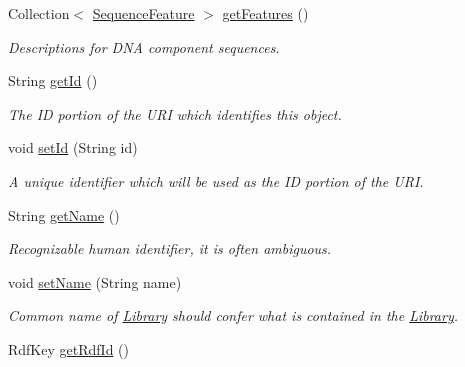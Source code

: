 \begin{DoxyCompactItemize}
Collection$<$ \hyperlink{classorg_1_1sbolstandard_1_1lib_s_b_o_lj_1_1_sequence_feature}{SequenceFeature} $>$ \hyperlink{classorg_1_1sbolstandard_1_1lib_s_b_o_lj_1_1_library_a12682cbad0f89c35435d903038743896}{getFeatures} ()
\begin{DoxyCompactList}\small\item\em Descriptions for DNA component sequences. \item\end{DoxyCompactList}\item 
String \hyperlink{classorg_1_1sbolstandard_1_1lib_s_b_o_lj_1_1_library_a98da83bad419811087a5b06bc4869027}{getId} ()
\begin{DoxyCompactList}\small\item\em The ID portion of the URI which identifies this object. \item\end{DoxyCompactList}\item 
void \hyperlink{classorg_1_1sbolstandard_1_1lib_s_b_o_lj_1_1_library_a935cbad6ab76005bd38cfa791b2a759a}{setId} (String id)
\begin{DoxyCompactList}\small\item\em A unique identifier which will be used as the ID portion of the URI. \item\end{DoxyCompactList}\item 
String \hyperlink{classorg_1_1sbolstandard_1_1lib_s_b_o_lj_1_1_library_a7f9c3f4e0e98634609f01238a32f8d81}{getName} ()
\begin{DoxyCompactList}\small\item\em Recognizable human identifier, it is often ambiguous. \item\end{DoxyCompactList}\item 
void \hyperlink{classorg_1_1sbolstandard_1_1lib_s_b_o_lj_1_1_library_ac7bf604c035c0cab532f607f577a98a5}{setName} (String name)
\begin{DoxyCompactList}\small\item\em Common name of \hyperlink{classorg_1_1sbolstandard_1_1lib_s_b_o_lj_1_1_library}{Library} should confer what is contained in the \hyperlink{classorg_1_1sbolstandard_1_1lib_s_b_o_lj_1_1_library}{Library}. \item\end{DoxyCompactList}\item 
RdfKey \hyperlink{classorg_1_1sbolstandard_1_1lib_s_b_o_lj_1_1_library_aa3e7c278322093a0d6111ce4dd5bf00c}{getRdfId} ()

\end{DoxyCompactItemize}
